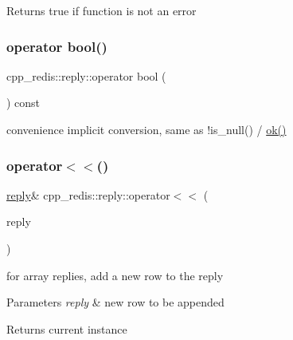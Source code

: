 \begin{DoxyReturn}{Returns}
true if function is not an error 
\end{DoxyReturn}
\mbox{\label{classcpp__redis_1_1reply_a74ef4651c068bfc68436f7e3c7a9a2e6}} 
\subsubsection{\texorpdfstring{operator bool()}{operator bool()}}
{\footnotesize\ttfamily cpp\+\_\+redis\+::reply\+::operator bool (\begin{DoxyParamCaption}\item[{void}]{ }\end{DoxyParamCaption}) const}

convenience implicit conversion, same as !is\+\_\+null() / \hyperlink{classcpp__redis_1_1reply_a1270c4197e0ce79df996565f44011ac0}{ok()} \mbox{\label{classcpp__redis_1_1reply_a4f2a05711b5db6b53108cb9eec4e19be}} 
\subsubsection{\texorpdfstring{operator$<$$<$()}{operator<<()}}
{\footnotesize\ttfamily \hyperlink{classcpp__redis_1_1reply}{reply}\& cpp\+\_\+redis\+::reply\+::operator$<$$<$ (\begin{DoxyParamCaption}\item[{const \hyperlink{classcpp__redis_1_1reply}{reply} \&}]{reply }\end{DoxyParamCaption})}

for array replies, add a new row to the reply


\begin{DoxyParams}{Parameters}
{\em reply} & new row to be appended \\
\hline
\end{DoxyParams}
\begin{DoxyReturn}{Returns}
current instance 
\end{DoxyReturn}
\mbox{\label{classcpp__redis_1_1reply_a2489d293128b2d567663a9d7fbbbc33e}} 
